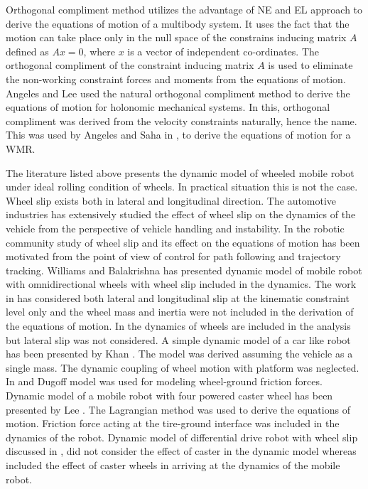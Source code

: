 Orthogonal compliment method utilizes the advantage of NE and EL approach to derive the equations of motion of  a multibody  system.  It uses the fact that the motion can take place only in the null space of the constrains inducing matrix $A$ defined as $Ax=0$, where $x$ is a vector of independent co-ordinates. The orthogonal compliment of the constraint inducing matrix $A$ is used to eliminate the non-working constraint  forces  and moments from the equations of motion.  Angeles and Lee \cite{angeles1988formulation} used the natural orthogonal compliment method to derive the equations of motion for holonomic mechanical systems. In this,  orthogonal compliment was derived from the velocity constraints naturally, hence the name. This was  used by Angeles \cite{angeles2013fundamentals} and Saha in \cite{saha1989kinematics},\cite{saha1991dynamics} to derive the equations of motion for a WMR. 

  The literature listed above presents the dynamic model of wheeled mobile robot under ideal rolling condition of wheels. In practical situation this is not the case.  Wheel slip exists both in lateral and longitudinal direction. The automotive industries  has extensively studied the effect of wheel slip on the dynamics of the vehicle from the perspective of vehicle handling and instability. In the robotic community study of wheel slip and its effect on the equations of motion has been motivated from the point of view of control for path following  and trajectory tracking.  Williams \cite{williams2002dynamic}  and Balakrishna  \cite{balakrishna1995modeling} has presented dynamic model of mobile robot with omnidirectional wheels with wheel slip included in the dynamics. The work in  \cite{williams2002dynamic} has considered both lateral and longitudinal slip at the kinematic  constraint level only and  the wheel mass and inertia were not included in the derivation of the equations of motion. In \cite{balakrishna1995modeling}   the dynamics of  wheels are included in the analysis but lateral slip  was not considered. A simple dynamic model of a car like robot has been presented by Khan \cite{khan2015longitudinal}. The model was derived assuming the  vehicle as a single mass. The dynamic coupling of wheel motion with platform was neglected. In \cite{balakrishna1995modeling} and \cite{khan2015longitudinal}   Dugoff model \cite{dakhlallah2008tire} was used for modeling wheel-ground friction forces. Dynamic model of a mobile robot with four powered caster wheel has been presented by Lee \cite{liu2010dynamic}. The Lagrangian method was used to derive the equations of motion. Friction force acting at the tire-ground interface was included in the dynamics of the robot.  Dynamic model of differential drive robot with wheel slip discussed in \cite{tian2009modeling},\cite{sidek2008dynamic} did not  consider the effect of caster in the dynamic model whereas \cite{konduri2014effect} included the effect of caster wheels in arriving at the dynamics of the mobile robot.
  
